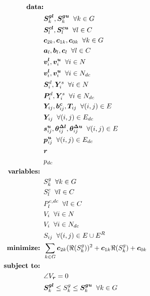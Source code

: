 \documentclass{article}
\begin{document}
\begin{align}
%
\mbox{\bf data:} & \nonumber \\ 
& \bm {S^{gl}}_k, \bm {S^{gu}}_k \;\; \forall k \in G \nonumber \\
& \bm {S^{cl}}_l, \bm {S^{cu}}_l \;\; \forall l \in C \nonumber \\
& \bm c_{2k}, \bm c_{1k}, \bm c_{0k} \;\; \forall k \in G \nonumber \\
& \bm a_l, \bm b_l, \bm c_l \;\; \forall l \in C \nonumber \\
& \bm {v^l}_i, \bm {v^u}_i \;\; \forall i \in N \nonumber \\
& \bm {v^l}_i, \bm {v^u}_i \;\; \forall i \in N_{dc} \nonumber \\
& \bm S^d_i, \bm Y^s_{i} \;\; \forall i \in N \nonumber \\
& \bm P^d_i, \bm Y^s_{i} \;\; \forall i \in N_{dc} \nonumber \\
& \bm Y_{ij}, \bm {b^c}_{ij}, \bm{T}_{ij} \;\; \forall (i,j) \in E \nonumber \\
& \bm Y_{ij} \;\; \forall (i,j) \in E_{dc} \nonumber \\
& \bm {s^u}_{ij}, \bm {\theta^{\Delta l}}_{ij}, \bm {\theta^{\Delta u}}_{ij} \;\; \forall (i,j) \in E \nonumber \\
& \bm {p^u}_{ij} \;\; \forall (i,j) \in E_{dc} \nonumber \\
& \bm r \nonumber \\
& p_{dc} \\
%
\mbox{\bf variables: } & \nonumber \\
& S^g_k \;\; \forall k\in G \nonumber \\
& S^c_l \;\; \forall l\in C \nonumber \\
& P^{c, dc}_l \;\; \forall l\in C \nonumber \\
& V_i \;\; \forall i\in N \nonumber \\
& V_i \;\; \forall i\in N_{dc} \nonumber \\
& S_{ij} \;\; \forall (i,j) \in E \cup E^R \nonumber \\
%
\mbox{\bf minimize: } & \sum_{k \in G} \bm c_{2k} (\Re(S^g_k))^2 + \bm c_{1k}\Re(S^g_k) + \bm c_{0k} \\
%
\mbox{\bf subject to: } & \nonumber \\
& \angle V_{\bm r} = 0 \\
& \bm {S^{gl}}_k \leq S^g_k \leq \bm {S^{gu}}_k \;\; \forall k \in G  \\

\end{align}
\end{document}
